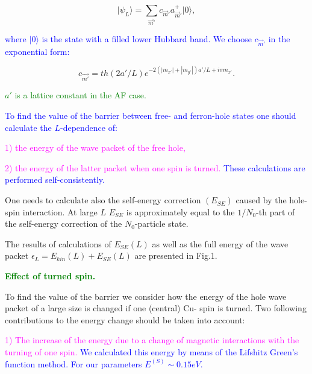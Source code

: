 \documentclass{article}
\begin{document}
\begin{Huge}
{{\vspace{10mm}
\noindent
$$
\vert \psi _L \rangle = \sum _{\vec{m} \prime} c_{\vec{m} \prime}
a^{+}_{\vec{m} \prime}
\vert 0 \rangle,
$$

\vspace{10mm}
\noindent
\textcolor{blue}{
where $\vert 0 \rangle $ is the
state with a filled lower Hubbard band.
We choose $c_{\vec{m} \prime}$ in the exponential form:}

\vspace{10mm}
\[
c_{\vec{m'}}= th (2 a'/L) e^{- 2 \left ( | m_{x'}| + |m_{y'}|
\right ) a' / L + i \pi m_{x'}}.
\]

\noindent
\textcolor{green}{$a'$ is a lattice constant in the AF case.}

\newpage
\noindent
\textcolor{blue}{
To find the value
of the barrier between free- and ferron-hole
states one should calculate the $L$-dependence of:}


\vspace{10mm}
\noindent
\textcolor{magenta}{
1) the energy of the wave packet of the free hole,}

\vspace{5mm}
\noindent
\textcolor{magenta}{
2) the energy of the latter packet when one spin is turned.}
\textcolor{blue}{These calculations are performed self-consistently.}

\vspace{10mm}
\noindent
One needs to calculate also the
self-energy correction $(E_{SE})$ caused by the hole-spin interaction.
At large $L$
$E_{SE}$  is approximately equal to the $1/N_0$-th part of
the self-energy correction of the $N_0$-particle state.

\noindent
The results  of calculations of $E_{SE}(L)$ as well as the full
energy of the wave packet
$\epsilon_L = E_{kin}(L) + E_{SE}(L)$
are presented in Fig.1.

\vspace{5mm}
\noindent

\newpage
\begin{center}
\textcolor{green}{
{\bf Effect of turned spin.}}
\end{center}

\noindent
To find the value of the barrier we
consider how the energy of the hole wave
packet of a large size is changed if one (central) Cu- spin
is turned. Two following contributions to the energy change should
be taken into account:

\noindent
\textcolor{magenta}{
1) The increase of the energy due to a change of magnetic interactions
with the turning of one spin.}
\textcolor{blue}{
We calculated   this energy by
means of the Lifshitz Green's function method.
For our parameters
$E^{(S)} \sim 0.15 eV$.}

}}
\end{Huge}
\end{document}
